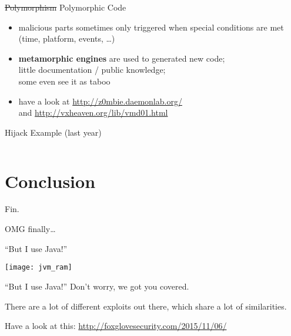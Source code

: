 \documentclass[beamer]{uibk}
\begin{document}
\begin{frame}{\st{Polymorphism} Polymorphic Code}
    \begin{itemize}
        \item malicious parts sometimes only triggered when special conditions
            are met (time, platform, events, \dots)
        \medskip
        \pause
        \item \textbf{metamorphic engines} are used to generated new code;\\
            little documentation / public knowledge;\\
            some even see it as taboo
        \medskip
        \pause
        \item have a look at \url{http://z0mbie.daemonlab.org/}\\
            and \url{http://vxheaven.org/lib/vmd01.html}
    \end{itemize}
\end{frame}

\begin{frame}[t,fragile]{Hijack Example (last year)}
    \begin{columns}
        \begin{column}{0.75\textwidth}
        \end{column}
        \begin{column}{0.25\textwidth}
        \end{column}
    \end{columns}
\end{frame}

\section*{Conclusion}

\begin{frame}{Fin.}
   \begin{center}
       \huge OMG finally\dots
   \end{center}
\end{frame}

\begin{frame}{``But I use Java!''}
    \begin{center}
        \texttt{[image: jvm\_ram]}
    \end{center}
\end{frame}

\begin{frame}{``But I use Java!''}
    Don't worry, we got you covered.

    \bigskip

    There are a lot of different exploits out there, which share a lot of
    similarities.

    \bigskip

    Have a look at this: \url{http://foxglovesecurity.com/2015/11/06/}
\end{frame}
\end{document}
